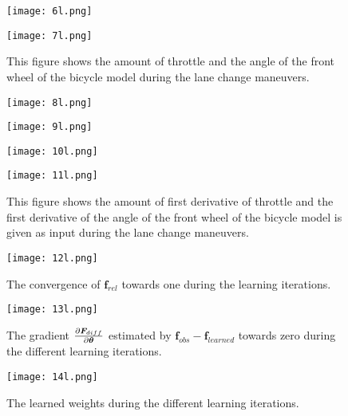 \begin{figure}[h!]
	\centering
	\texttt{[image: 6l.png]}
	\label{fig:lat_acc_val}
\end{figure}


\begin{figure}[h!]
	\centering
	\texttt{[image: 7l.png]}
	\caption{This figure shows the amount of throttle and the angle of the front wheel of the bicycle model during the lane change maneuvers.}
	\label{fig:app_delta}
\end{figure}


\begin{figure}[h!]
	\centering
	\texttt{[image: 8l.png]}
	\label{fig:lat_acc_val}
\end{figure}


\begin{figure}[h!]
	\centering
	\texttt{[image: 9l.png]}
	\label{fig:lat_acc_val}
\end{figure}


\begin{figure}[h!]
	\centering
	\texttt{[image: 10l.png]}
	\label{fig:lat_acc_val}
\end{figure}


\begin{figure}[h!]
	\centering
	\texttt{[image: 11l.png]}
	\caption{This figure shows the amount of first derivative of throttle and the first derivative of the angle of the front wheel of the bicycle model is given as input during the lane change maneuvers.}
	\label{fig:app_delta_dot}
\end{figure}


\begin{figure}[h!]
	\centering
	\texttt{[image: 12l.png]}	
	\caption{The convergence of $\bm{f}_{rel}$ towards one during the learning iterations.}
	\label{fig:app_conv}
\end{figure}


\begin{figure}[h!]
	\centering
	\texttt{[image: 13l.png]}
	\caption{The gradient $\pdv{\bm{F}_{diff}}{\bm{\theta}}$ estimated by $\bm{f}_{obs} - \bm{f}_{learned}$ towards zero during the different learning iterations.}
	\label{fig:app_grad}
\end{figure}

\begin{figure}[h!]
	\centering
	\texttt{[image: 14l.png]}
	\caption{The learned weights during the different learning iterations.}
	\label{fig:app_weights}
	
\end{figure}


